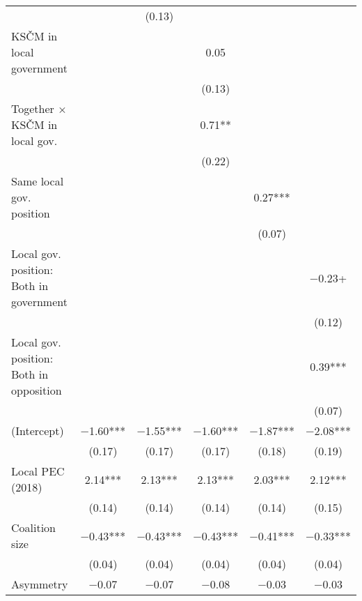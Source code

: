 \begin{longtable}{lccccc}
&                 & (\num{0.13})   &                 &                 &                 \\
KSČM in local government                &                 &                 & \num{0.05}     &                 &                 \\
&                 &                 & (\num{0.13})   &                 &                 \\
Together × KSČM in local gov.           &                 &                 & \num{0.71}**   &                 &                 \\
&                 &                 & (\num{0.22})   &                 &                 \\
Same local gov. position                &                 &                 &                 & \num{0.27}***  &                 \\
&                 &                 &                 & (\num{0.07})   &                 \\
Local gov. position: Both in government &                 &                 &                 &                 & \num{-0.23}+   \\
&                 &                 &                 &                 & (\num{0.12})   \\
Local gov. position: Both in opposition &                 &                 &                 &                 & \num{0.39}***  \\
&                 &                 &                 &                 & (\num{0.07})   \\
(Intercept)                             & \num{-1.60}*** & \num{-1.55}*** & \num{-1.60}*** & \num{-1.87}*** & \num{-2.08}*** \\
& (\num{0.17})   & (\num{0.17})   & (\num{0.17})   & (\num{0.18})   & (\num{0.19})   \\
Local PEC (2018)                        & \num{2.14}***  & \num{2.13}***  & \num{2.13}***  & \num{2.03}***  & \num{2.12}***  \\
& (\num{0.14})   & (\num{0.14})   & (\num{0.14})   & (\num{0.14})   & (\num{0.15})   \\
Coalition size                          & \num{-0.43}*** & \num{-0.43}*** & \num{-0.43}*** & \num{-0.41}*** & \num{-0.33}*** \\
& (\num{0.04})   & (\num{0.04})   & (\num{0.04})   & (\num{0.04})   & (\num{0.04})   \\
Asymmetry                               & \num{-0.07}    & \num{-0.07}    & \num{-0.08}    & \num{-0.03}    & \num{-0.03}    \\

\end{longtable}
